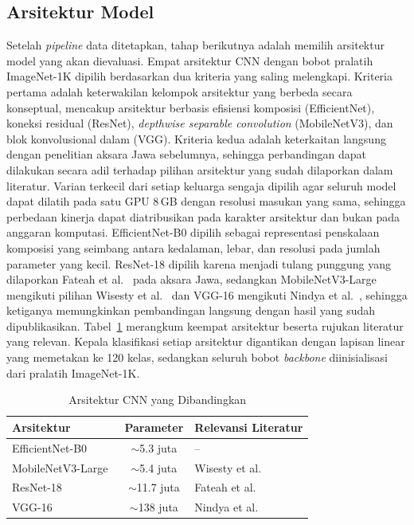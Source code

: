 \documentclass[conference]{IEEEtran}
\begin{document}
\subsection{Arsitektur Model}

Setelah \textit{pipeline} data ditetapkan, tahap berikutnya adalah
memilih arsitektur model yang akan dievaluasi.
Empat arsitektur CNN dengan bobot pralatih ImageNet-1K dipilih
berdasarkan dua kriteria yang saling melengkapi.
Kriteria pertama adalah keterwakilan kelompok arsitektur yang berbeda
secara konseptual, mencakup arsitektur berbasis efisiensi komposisi
(EfficientNet), koneksi residual (ResNet), \textit{depthwise separable
convolution} (MobileNetV3), dan blok konvolusional dalam (VGG).
Kriteria kedua adalah keterkaitan langsung dengan penelitian aksara
Jawa sebelumnya, sehingga perbandingan dapat dilakukan secara adil
terhadap pilihan arsitektur yang sudah dilaporkan dalam literatur.
Varian terkecil dari setiap keluarga sengaja dipilih agar seluruh
model dapat dilatih pada satu GPU 8\,GB dengan resolusi masukan yang
sama, sehingga perbedaan kinerja dapat diatribusikan pada karakter
arsitektur dan bukan pada anggaran komputasi.
EfficientNet-B0 dipilih sebagai representasi penskalaan komposisi
yang seimbang antara kedalaman, lebar, dan resolusi pada jumlah
parameter yang kecil.
ResNet-18 dipilih karena menjadi tulang punggung yang dilaporkan
Fateah et al.~\cite{ifriza2026} pada aksara Jawa, sedangkan
MobileNetV3-Large mengikuti pilihan Wisesty et al.~\cite{wisesty2026}
dan VGG-16 mengikuti Nindya et al.~\cite{nindya2025}, sehingga
ketiganya memungkinkan pembandingan langsung dengan hasil yang
sudah dipublikasikan.
Tabel~\ref{tab:arch} merangkum keempat arsitektur beserta rujukan
literatur yang relevan.
Kepala klasifikasi setiap arsitektur digantikan dengan lapisan
linear yang memetakan ke 120 kelas, sedangkan seluruh bobot
\textit{backbone} diinisialisasi dari pralatih ImageNet-1K.

\begin{table}[t]
\caption{Arsitektur CNN yang Dibandingkan}
\label{tab:arch}
\begin{center}
\renewcommand{\arraystretch}{1.2}
\begin{tabular}{lcl}
\toprule
\textbf{Arsitektur} & \textbf{Parameter} & \textbf{Relevansi Literatur} \\
\midrule
EfficientNet-B0~\cite{tan2019efficientnet}    & $\sim$5.3 juta  & -- \\
MobileNetV3-Large~\cite{howard2019mobilenetv3}& $\sim$5.4 juta  & Wisesty et al.~\cite{wisesty2026} \\
ResNet-18~\cite{he2016resnet}                 & $\sim$11.7 juta & Fateah et al.~\cite{ifriza2026} \\
VGG-16~\cite{simonyan2015vgg}                 & $\sim$138 juta  & Nindya et al.~\cite{nindya2025} \\
\bottomrule
\end{tabular}
\end{center}
\end{table}
\end{document}

